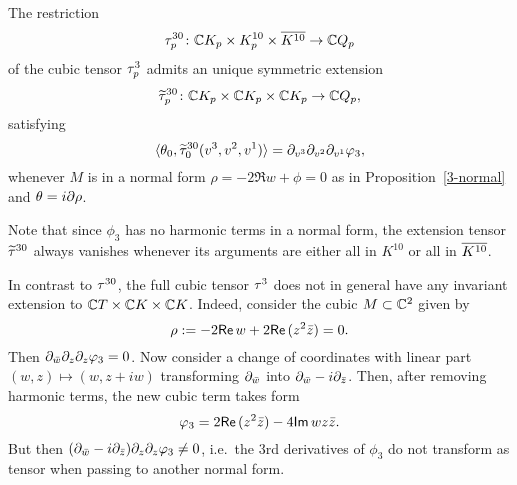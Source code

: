 \documentclass[12pt]{amsart}
\begin{document}
\bl{}
The restriction 
$$
	\tau^{30}_p \colon {\mathbb{C}} K_p \times K^{10}_p\times \overline{K^{10}} \to {\mathbb{C}} Q_p
$$ 
of the cubic tensor $\tau^3_p$
 admits an unique symmetric extension
$$
	\widetilde{\tau}^{30}_p \colon
	{\mathbb{C}} K_p \times {\mathbb{C}} K_p \times {\mathbb{C}} K_p \to {\mathbb{C}} Q_p,
$$
satisfying
$$
	\langle \theta_0,  \widetilde{\tau}^{30}_0(v^3, v^2, v^1) \rangle
	= \partial_{v^3} \partial_{v^2} \partial_{v^1} \varphi_3,
$$
whenever $M$ is in a normal form $\rho= -2\Re w +\phi=0$
as in Proposition~\ref{3-normal}
and $\theta = i\partial\rho$.
\el

\br
Note that since $\phi_3$ has no harmonic terms in a normal form,
the extension tensor $\widetilde{\tau}^{30}$ 
always vanishes whenever its arguments
are either all in $K^{10}$ or all in $\overline{K^{10}}$.
\er

\be
In contrast to $\tau^{30}$, the full cubic tensor $\tau^3$
does not in general have any invariant extension to
${\mathbb{C}} T\times {\mathbb{C}} K \times {\mathbb{C}} K$.
Indeed, consider the cubic $M\subset {\mathbb{C}}^2$ given by
$$
	\rho := -2{\sf Re}\, w + 2{\sf Re}\, (z^2{\bar z}) =0.
$$
Then $\partial_{{\bar w}} \partial_z \partial_z\varphi_3=0$.
Now consider a change of coordinates with linear part
$(w,z)\mapsto (w, z+ iw)$ transforming $\partial_{{\bar w}}$
into $\partial_{{\bar w}}-i\partial_{{\bar z}}$.
Then, after removing harmonic terms, the new cubic term takes form
$$
	\varphi_3 = 2{\sf Re}\, (z^2{\bar z}) - 4{\sf Im}\, w z{\bar z}.
$$
But then $(\partial_{{\bar w}} -i\partial_{{\bar z}}) \partial_z \partial_z\varphi_3\ne 0$, 
i.e.\ the $3$rd derivatives of $\phi_3$ do not transform as tensor
when passing to another normal form.
\ee



%
%





%
\end{document}
